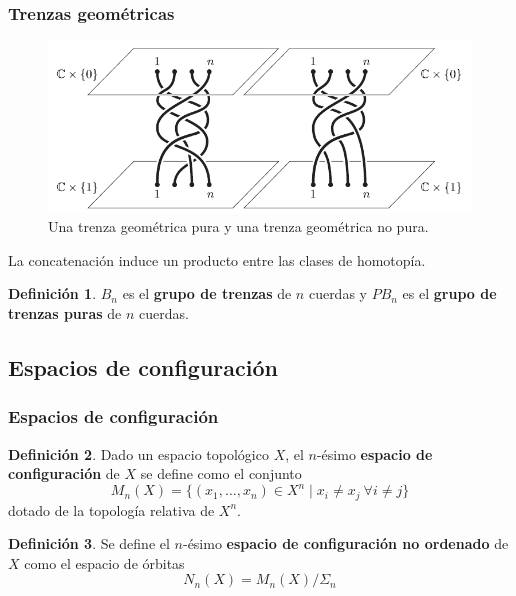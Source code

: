 \documentclass{beamer}
\theoremstyle{definition}
\newtheorem{defi}{Definición}
\begin{document}
\begin{frame}
\frametitle{Trenzas geométricas}
\begin{figure}[h!]
\includegraphics[scale=0.5]{Imagenes/hilos}
\caption{Una trenza geométrica pura y una trenza geométrica no pura.}
\end{figure}
\end{frame}


\begin{frame}

La concatenación induce un producto entre las clases de homotopía.
\begin{defi}
$B_n$ es el \textbf{grupo de trenzas} de $n$ cuerdas y $PB_n$ es el \textbf{grupo de trenzas puras} de $n$ cuerdas.
\end{defi}
\end{frame}

\subsection{Espacios de configuración}

\begin{frame}
\frametitle{Espacios de configuración}
\begin{defi}
Dado un espacio topológico $X$, el $n$-ésimo \textbf{espacio de configuración} de $X$ se define como el conjunto
$$M_n(X)=\{(x_1,\dots,x_n)\in X^n\mid x_i\neq x_j\ \forall i\neq j\}$$
dotado de la topología relativa de $X^n$.
\end{defi}
\begin{defi}
Se define el $n$-ésimo \textbf{espacio de configuración no ordenado} de $X$ como el espacio de órbitas
$$N_n(X)=M_n(X)/\Sigma_n$$
\end{defi}
\end{frame}
\end{document}
